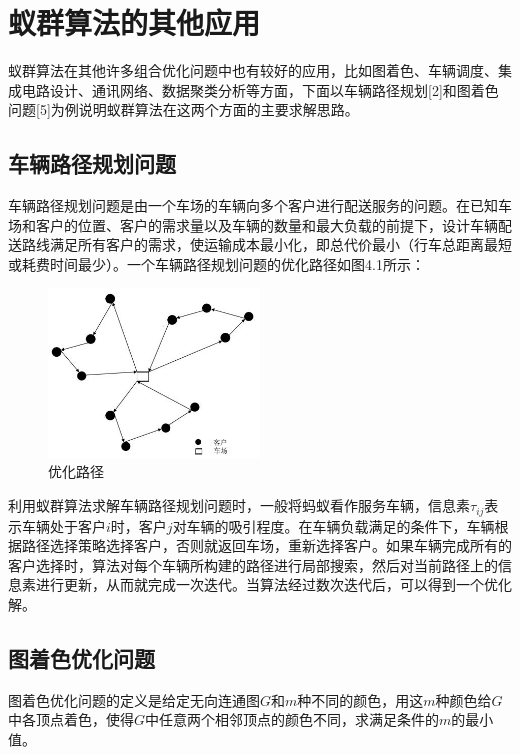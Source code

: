 \documentclass[a4paper,12pt]{report}
\begin{document}
\chapter{蚁群算法的其他应用}


\pagestyle{fancy}


	蚁群算法在其他许多组合优化问题中也有较好的应用，比如图着色、车辆调度、集成电路设计、通讯网络、数据聚类分析等方面，下面以车辆路径规划[2]和图着色问题[5]为例说明蚁群算法在这两个方面的主要求解思路。

\begin{spacing}{1.5}
	
\section{车辆路径规划问题}
	车辆路径规划问题是由一个车场的车辆向多个客户进行配送服务的问题。在已知车场和客户的位置、客户的需求量以及车辆的数量和最大负载的前提下，设计车辆配送路线满足所有客户的需求，使运输成本最小化，即总代价最小（行车总距离最短或耗费时间最少）。一个车辆路径规划问题的优化路径如图4.1所示：
	\begin{figure}[htbp]
		\centering
		\includegraphics[width=0.5\textwidth]{pic/ant6.jpg}
		\caption{优化路径}
		\label{fig:pt1}
	\end{figure}
	
	利用蚁群算法求解车辆路径规划问题时，一般将蚂蚁看作服务车辆，信息素$\tau_{ij}$表示车辆处于客户$i$时，客户$j$对车辆的吸引程度。在车辆负载满足的条件下，车辆根据路径选择策略选择客户，否则就返回车场，重新选择客户。如果车辆完成所有的客户选择时，算法对每个车辆所构建的路径进行局部搜索，然后对当前路径上的信息素进行更新，从而就完成一次迭代。当算法经过数次迭代后，可以得到一个优化解。

\section{图着色优化问题}
	图着色优化问题的定义是给定无向连通图$G$和$m$种不同的颜色，用这$m$种颜色给$G$中各顶点着色，使得$G$中任意两个相邻顶点的颜色不同，求满足条件的$m$的最小值。


\end{spacing}
\end{document}

